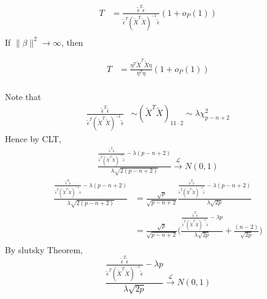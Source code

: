 \documentclass[review]{elsarticle}
\theoremstyle{plain}
\theoremstyle{definition}
\theoremstyle{remark}
\begin{document}
\begin{equation}
    \begin{aligned}
        T&=
        \frac{\tilde{\epsilon}^T\tilde{\epsilon}
    }{\tilde{\epsilon}^T{(\tilde{X}^T\tilde{X})}^{-1}\tilde{\epsilon}
        }(1+o_P(1))\\
    \end{aligned}
\end{equation}
If $\|\beta\|^2\to \infty$, then

\begin{equation}
    \begin{aligned}
        T&=
        \frac{\eta^T \tilde{X}^T\tilde{X} \eta    
        }{\eta^T\eta}(1+o_P(1))\\
    \end{aligned}
\end{equation}

Note that
\begin{equation}
    \begin{aligned}
        \frac{\tilde{\epsilon}^T\tilde{\epsilon}
    }{\tilde{\epsilon}^T{(\tilde{X}^T\tilde{X})}^{-1}\tilde{\epsilon}
        }&\sim {(\tilde{X}^T\tilde{X})}_{11\cdot 2}\sim \lambda \chi^2_{p-n+2}
    \end{aligned}
\end{equation}
Hence by CLT,
\begin{equation}
    \begin{aligned}
        \frac{\frac{\tilde{\epsilon}^T\tilde{\epsilon}
    }{\tilde{\epsilon}^T{(\tilde{X}^T\tilde{X})}^{-1}\tilde{\epsilon}
        }-\lambda (p-n+2)}{\lambda\sqrt{2(p-n+2)}
        }\xrightarrow{\mathcal{L}}N(0,1)
    \end{aligned}
\end{equation}
\begin{equation}
    \begin{aligned}
        \frac{\frac{\tilde{\epsilon}^T\tilde{\epsilon}
    }{\tilde{\epsilon}^T{(\tilde{X}^T\tilde{X})}^{-1}\tilde{\epsilon}
        }-\lambda (p-n+2)}{\lambda\sqrt{2(p-n+2)}
        }&=
        \frac{\sqrt{p}}{\sqrt{p-n+2}}
        \frac{\frac{\tilde{\epsilon}^T\tilde{\epsilon}
    }{\tilde{\epsilon}^T{(\tilde{X}^T\tilde{X})}^{-1}\tilde{\epsilon}
        }-{\lambda(p-n+2)}}{\lambda\sqrt{2p}
        }\\
        &=
        \frac{\sqrt{p}}{\sqrt{p-n+2}}
        \Big(\frac{\frac{\tilde{\epsilon}^T\tilde{\epsilon}
    }{\tilde{\epsilon}^T{(\tilde{X}^T\tilde{X})}^{-1}\tilde{\epsilon}
        }-{\lambda p}}{\lambda\sqrt{2p}
        }+\frac{(n-2)}{\sqrt{2p}}\Big)\\
    \end{aligned}
\end{equation}
By slutsky Theorem, 
\begin{equation}
    \frac{\frac{\tilde{\epsilon}^T\tilde{\epsilon}
    }{\tilde{\epsilon}^T{(\tilde{X}^T\tilde{X})}^{-1}\tilde{\epsilon}
        }-{\lambda p}}{\lambda\sqrt{2p}
        }\xrightarrow{\mathcal{L}}N(0,1)
\end{equation}
\end{document}

